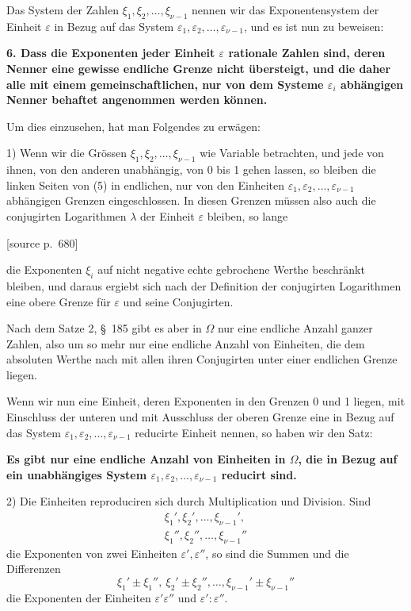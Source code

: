 \documentclass[11pt]{article}
\newcommand{\srcpage}[1]{\par\medskip\noindent\textsf{[source p.~#1]}\par\smallskip}
\begin{document}
Das System der Zahlen $\xi_1,\xi_2,\ldots,\xi_{\nu-1}$ nennen wir das Exponentensystem der Einheit $\varepsilon$ in Bezug auf das System $\varepsilon_1,\varepsilon_2,\ldots,\varepsilon_{\nu-1}$, und es ist nun zu beweisen:

\textbf{6. Dass die Exponenten jeder Einheit $\varepsilon$ rationale Zahlen sind, deren Nenner eine gewisse endliche Grenze nicht übersteigt, und die daher alle mit einem gemeinschaftlichen, nur von dem Systeme $\varepsilon_i$ abhängigen Nenner behaftet angenommen werden können.}

Um dies einzusehen, hat man Folgendes zu erwägen:

1) Wenn wir die Grössen $\xi_1,\xi_2,\ldots,\xi_{\nu-1}$ wie Variable betrachten, und jede von ihnen, von den anderen unabhängig, von 0 bis 1 gehen lassen, so bleiben die linken Seiten von (5) in endlichen, nur von den Einheiten $\varepsilon_1,\varepsilon_2,\ldots,\varepsilon_{\nu-1}$ abhängigen Grenzen eingeschlossen. In diesen Grenzen müssen also auch die conjugirten Logarithmen $\lambda$ der Einheit $\varepsilon$ bleiben, so lange
\srcpage{680}
die Exponenten $\xi_i$ auf nicht negative echte gebrochene Werthe beschränkt bleiben, und daraus ergiebt sich nach der Definition der conjugirten Logarithmen eine obere Grenze für $\varepsilon$ und seine Conjugirten.

Nach dem Satze 2, \S~185 gibt es aber in $\Omega$ nur eine endliche Anzahl ganzer Zahlen, also um so mehr nur eine endliche Anzahl von Einheiten, die dem absoluten Werthe nach mit allen ihren Conjugirten unter einer endlichen Grenze liegen.

Wenn wir nun eine Einheit, deren Exponenten in den Grenzen 0 und 1 liegen, mit Einschluss der unteren und mit Ausschluss der oberen Grenze eine in Bezug auf das System $\varepsilon_1,\varepsilon_2,\ldots,\varepsilon_{\nu-1}$ reducirte Einheit nennen, so haben wir den Satz:

\textbf{Es gibt nur eine endliche Anzahl von Einheiten in $\Omega$, die in Bezug auf ein unabhängiges System $\varepsilon_1,\varepsilon_2,\ldots,\varepsilon_{\nu-1}$ reducirt sind.}

2) Die Einheiten reproduciren sich durch Multiplication und Division. Sind
\[
\begin{array}{c}
\xi_1',\xi_2',\ldots,\xi_{\nu-1}',\\
\xi_1'',\xi_2'',\ldots,\xi_{\nu-1}''
\end{array}
\]
die Exponenten von zwei Einheiten $\varepsilon',\varepsilon''$, so sind die Summen und die Differenzen
\[
\xi_1'\pm\xi_1'',\ \xi_2'\pm\xi_2'',\ldots,\xi_{\nu-1}'\pm\xi_{\nu-1}''
\]
die Exponenten der Einheiten $\varepsilon'\varepsilon''$ und $\varepsilon':\varepsilon''$.
\end{document}
